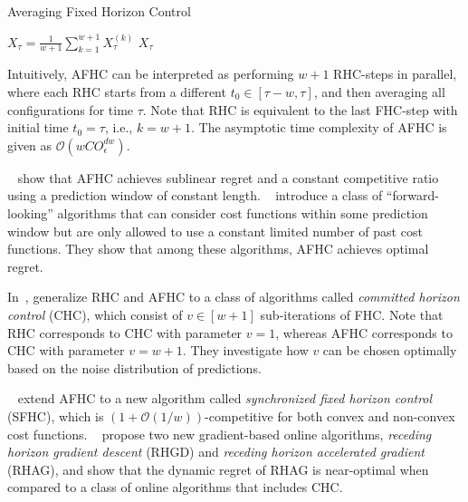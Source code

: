 \begin{algorithm}
    \caption{Averaging Fixed Horizon Control~\cite{Lin2012}}\label{alg:predictions:afhc}
    $X_{\tau} = \frac{1}{w+1} \sum_{k=1}^{w+1} X_{\tau}^{(k)}$\;
    \Return $X_{\tau}$\;
\end{algorithm}

Intuitively, AFHC can be interpreted as performing $w+1$ RHC-steps in parallel, where each RHC starts from a different $t_0 \in [\tau-w,\tau]$, and then averaging all configurations for time $\tau$. Note that RHC is equivalent to the last FHC-step with initial time $t_0 = \tau$, i.e., $k = w+1$. The asymptotic time complexity of AFHC is given as $\mathcal{O}(w C O_{\epsilon}^{dw})$.

\citeauthor*{Chen2015}~\cite{Chen2015} show that AFHC achieves sublinear regret and a constant competitive ratio using a prediction window of constant length. \citeauthor*{Badiei2015}~\cite{Badiei2015} introduce a class of ``forward-looking'' algorithms that can consider cost functions within some prediction window but are only allowed to use a constant limited number of past cost functions. They show that among these algorithms, AFHC achieves optimal regret.

In~\cite{Chen2016}, \citeauthor*{Chen2016} generalize RHC and AFHC to a class of algorithms called \emph{committed horizon control} (CHC), which consist of $v \in [w+1]$ sub-iterations of FHC. Note that RHC corresponds to CHC with parameter $v = 1$, whereas AFHC corresponds to CHC with parameter $v = w+1$. They investigate how $v$ can be chosen optimally based on the noise distribution of predictions.

\citeauthor*{Lin2019}~\cite{Lin2019} extend AFHC to a new algorithm called \emph{synchronized fixed horizon control} (SFHC), which is $(1 + \mathcal{O}(1/w))$-competitive for both convex and non-convex cost functions. \citeauthor*{Li2018}~\cite{Li2018} propose two new gradient-based online algorithms, \emph{receding horizon gradient descent} (RHGD) and \emph{receding horizon accelerated gradient} (RHAG), and show that the dynamic regret of RHAG is near-optimal when compared to a class of online algorithms that includes CHC.

